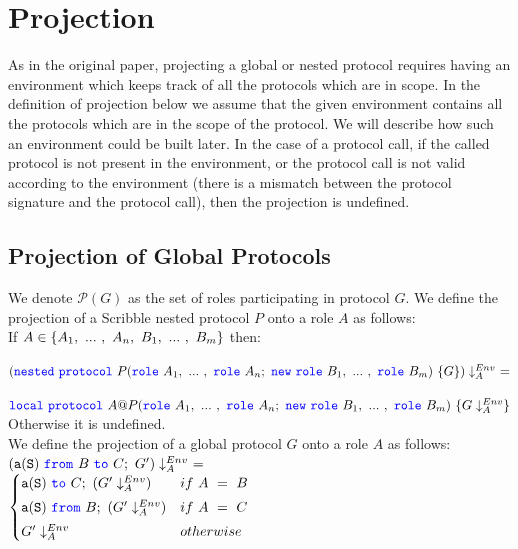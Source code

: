 \documentclass[12pt,twoside]{report}
\begin{document}
\section{Projection}
As in the original paper, projecting a global or nested protocol requires having an environment which keeps track of all the protocols which are in scope. In the definition of projection below we assume that the given environment contains all the protocols which are in the scope of the protocol. We will describe how such an environment could be built later. In the case of a protocol call, if the called protocol is not present in the environment, or the protocol call is not valid according to the environment (there is a mismatch between the protocol signature and the protocol call), then the projection is undefined.

\subsection{Projection of Global Protocols}
We denote $\mathcal{P}(G)$ as the set of roles participating in protocol $G$. We define the projection of a Scribble nested protocol $P$ onto a role $A$ as follows: \\

If $A \in \{\roles{A}{n},\ \roles{B}{m}\}$ then:

$(\nested\ \protocol\ P(\rolessig{A}{n};\ \scrnew\ \rolessig{B}{m})\ \{G\})\downarrow_A^{Env}\ =$

$\scrlocal\ \protocol\ A@P(\rolessig{A}{n};\ \scrnew\ \rolessig{B}{m})\ \{G \downarrow_A^{Env}\}$\\





Otherwise it is undefined.\\

 We define the projection of a global protocol $G$ onto a role $A$ as follows:\\
    
 
 $(\mathtt{a}(\mathtt{S})\ {\color{blue}\mathtt{from}}\ B\ {\color{blue}\mathtt{to}}\ C;\ G') \downarrow_A^{Env}\ =\ $\\[3.5pt]
\begin{math}
    \begin{cases}
        \scrmessage{a}{S}\ \scrto\ C;\ (G' \project) & if\ A\ =\ B\\[3pt]
        \scrmessage{a}{S}\ \from\ B;\ (G' \project) & if\ A\ =\ C\\[3pt]
        G' \project & otherwise
    \end{cases}\\\\
\end{math}
 
\end{document}
